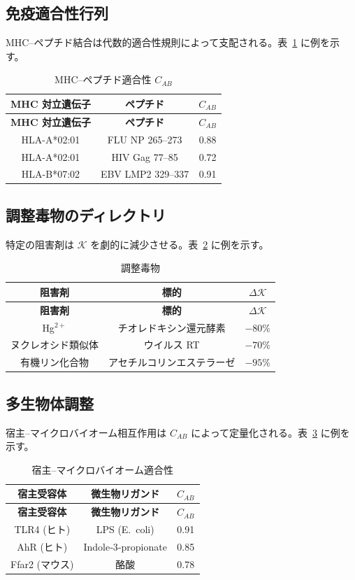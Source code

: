 \documentclass[12pt,a4paper]{ltjsarticle}
\newcommand{\REL}{\mathcal{K}}          %
\begin{document}
	\subsection{免疫適合性行列}
	MHC–ペプチド結合は代数的適合性規則によって支配される。表~\ref{tab:mhc} に例を示す。
	
	\begin{longtable}{|c|c|c|}
		\caption{MHC–ペプチド適合性 \(C_{AB}\)}\label{tab:mhc}\\
		\hline
		\textbf{MHC 対立遺伝子} & \textbf{ペプチド} & \(C_{AB}\) \\
		\hline
		\endfirsthead
		\hline
		\textbf{MHC 対立遺伝子} & \textbf{ペプチド} & \(C_{AB}\) \\
		\hline
		\endhead
		\hline
		HLA-A*02:01 & FLU NP 265–273 & 0.88 \\
		HLA-A*02:01 & HIV Gag 77–85 & 0.72 \\
		HLA-B*07:02 & EBV LMP2 329–337 & 0.91 \\
		\hline
	\end{longtable}
	
	\subsection{調整毒物のディレクトリ}
	特定の阻害剤は \(\REL\) を劇的に減少させる。表~\ref{tab:poisons} に例を示す。
	
	\begin{longtable}{|c|c|c|}
		\caption{調整毒物}\label{tab:poisons}\\
		\hline
		\textbf{阻害剤} & \textbf{標的} & \(\Delta \REL\) \\
		\hline
		\endfirsthead
		\hline
		\textbf{阻害剤} & \textbf{標的} & \(\Delta \REL\) \\
		\hline
		\endhead
		\hline
		Hg\(^{2+}\) & チオレドキシン還元酵素 & \(-80\%\) \\
		ヌクレオシド類似体 & ウイルス RT & \(-70\%\) \\
		有機リン化合物 & アセチルコリンエステラーゼ & \(-95\%\) \\
		\hline
	\end{longtable}
	
	\subsection{多生物体調整}
	宿主–マイクロバイオーム相互作用は \(C_{AB}\) によって定量化される。表~\ref{tab:microbiome} に例を示す。
	
	\begin{longtable}{|c|c|c|}
		\caption{宿主–マイクロバイオーム適合性}\label{tab:microbiome}\\
		\hline
		\textbf{宿主受容体} & \textbf{微生物リガンド} & \(C_{AB}\) \\
		\hline
		\endfirsthead
		\hline
		\textbf{宿主受容体} & \textbf{微生物リガンド} & \(C_{AB}\) \\
		\hline
		\endhead
		\hline
		TLR4 (ヒト) & LPS (E.\ coli) & 0.91 \\
		AhR (ヒト) & Indole‑3‑propionate & 0.85 \\
		Ffar2 (マウス) & 酪酸 & 0.78 \\
		\hline
	\end{longtable}
	
\end{document}
